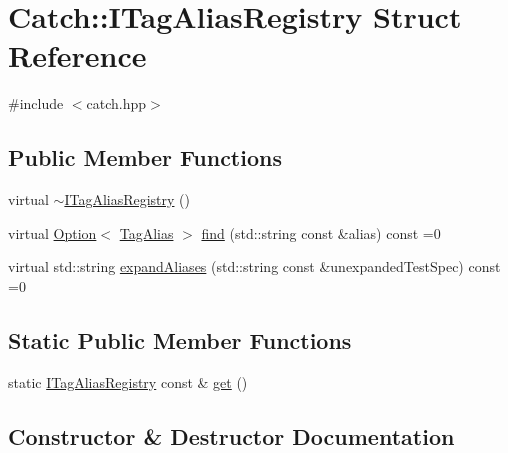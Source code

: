 \hypertarget{struct_catch_1_1_i_tag_alias_registry}{}\section{Catch\+:\+:I\+Tag\+Alias\+Registry Struct Reference}
\label{struct_catch_1_1_i_tag_alias_registry}


{\ttfamily \#include $<$catch.\+hpp$>$}

\subsection*{Public Member Functions}
\begin{DoxyCompactItemize}
\item 
virtual \hyperlink{struct_catch_1_1_i_tag_alias_registry_a8967db4dd40b68e22697eff0f4928239}{$\sim$\+I\+Tag\+Alias\+Registry} ()
\item 
virtual \hyperlink{class_catch_1_1_option}{Option}$<$ \hyperlink{struct_catch_1_1_tag_alias}{Tag\+Alias} $>$ \hyperlink{struct_catch_1_1_i_tag_alias_registry_a7d2fba4d39cfcc62c2695fcde4f989c3}{find} (std\+::string const \&alias) const =0
\item 
virtual std\+::string \hyperlink{struct_catch_1_1_i_tag_alias_registry_ae729a7532faf7466db1a157ce0395170}{expand\+Aliases} (std\+::string const \&unexpanded\+Test\+Spec) const =0
\end{DoxyCompactItemize}
\subsection*{Static Public Member Functions}
\begin{DoxyCompactItemize}
\item 
static \hyperlink{struct_catch_1_1_i_tag_alias_registry}{I\+Tag\+Alias\+Registry} const  \& \hyperlink{struct_catch_1_1_i_tag_alias_registry_aa9d0f008f49473389c7abf6071f137a7}{get} ()
\end{DoxyCompactItemize}


\subsection{Constructor \& Destructor Documentation}
\hypertarget{struct_catch_1_1_i_tag_alias_registry_a8967db4dd40b68e22697eff0f4928239}{}\label{struct_catch_1_1_i_tag_alias_registry_a8967db4dd40b68e22697eff0f4928239} 

